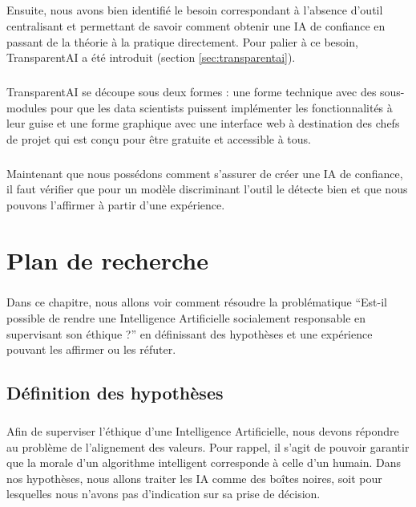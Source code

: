\documentclass[10pt, french, a4paper]{report}
\begin{document}
\paragraph{}
Ensuite, nous avons bien identifié le besoin correspondant à l'absence d'outil centralisant et permettant de savoir comment obtenir une IA de confiance en passant de la théorie à la pratique directement. Pour palier à ce besoin, TransparentAI a été introduit (section \ref{sec:transparentai}).

\paragraph{}
TransparentAI se découpe sous deux formes : une forme technique avec des sous-modules pour que les data scientists puissent implémenter les fonctionnalités à leur guise et une forme graphique avec une interface web à destination des chefs de projet qui est conçu pour être gratuite et accessible à tous.

\paragraph{}
Maintenant que nous possédons comment s'assurer de créer une IA de confiance, il faut vérifier que pour un modèle discriminant l'outil le détecte bien et que nous pouvons l'affirmer à partir d'une expérience.

\newpage
\chapter{Plan de recherche}

\paragraph{}
Dans ce chapitre, nous allons voir comment résoudre la problématique ``Est-il possible de rendre une Intelligence Artificielle socialement responsable en supervisant son éthique ?'' en définissant des hypothèses et une expérience pouvant les affirmer ou les réfuter.

\section{Définition des hypothèses}

\paragraph{}
Afin de superviser l'éthique d'une Intelligence Artificielle, nous devons répondre au problème de l'alignement des valeurs. Pour rappel, il s'agit de pouvoir garantir que la morale d'un algorithme intelligent corresponde à celle d'un humain. Dans nos hypothèses, nous allons traiter les IA comme des boîtes noires, soit pour lesquelles nous n'avons pas d'indication sur sa prise de décision.
\end{document}
